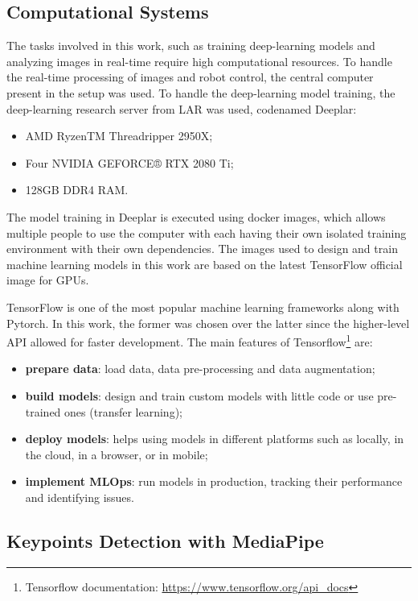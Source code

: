\subsection{Computational Systems}

The tasks involved in this work, such as training deep-learning models and analyzing images in real-time require high computational resources. To handle the real-time processing of images and robot control, the central computer present in the setup was used. To handle the deep-learning model training, the deep-learning research server from LAR was used, codenamed Deeplar:
\begin{itemize}
    \item AMD RyzenTM Threadripper 2950X;
    \item Four NVIDIA GEFORCE® RTX 2080 Ti;
    \item 128GB DDR4 RAM.
\end{itemize}

The model training in Deeplar is executed using docker images, which allows multiple people to use the computer with each having their own isolated training environment with their own dependencies. The images used to design and train machine learning models in this work are based on the latest TensorFlow official image for GPUs.

TensorFlow is one of the most popular machine learning frameworks along with Pytorch. In this work, the former was chosen over the latter since the higher-level API allowed for faster development. The main features of Tensorflow\footnote{Tensorflow documentation: \url{https://www.tensorflow.org/api_docs}} are:
\begin{itemize}
    \item \textbf{prepare data}: load data, data pre-processing and data augmentation;
    \item \textbf{build models}: design and train custom models with little code or use pre-trained ones (transfer learning);
    \item \textbf{deploy models}: helps using models in different platforms such as locally, in the cloud, in a browser, or in mobile;
    \item \textbf{implement MLOps}: run models in production, tracking their performance and identifying issues.
\end{itemize}

\subsection{Keypoints Detection with MediaPipe}
\label{subsection:keypointdetection}

